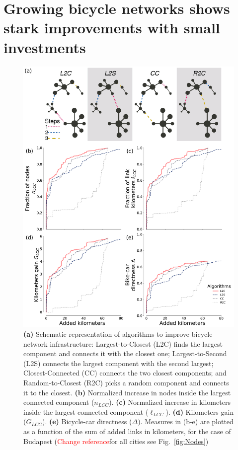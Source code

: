 \section{Growing bicycle networks shows stark improvements with small investments}

\begin{figure}[htbp]
  \centering
  \includegraphics[width=\textwidth]{images/datadriven/Fig03.pdf}
  \caption[Algorithms improvement]{\textbf{(a)} Schematic representation of algorithms to improve bicycle network infrastructure: Largest-to-Closest (L2C) finds the largest component and connects it with the closest one; Largest-to-Second (L2S) connects the largest component with the second largest; Closest-Connected (CC) connects the two closest components; and Random-to-Closest (R2C) picks a random component and connects it to the closest. \textbf{(b)} Normalized increase in nodes inside the largest connected component ($n_{LCC}$). \textbf{(c)} Normalized increase in kilometers inside the largest connected component ($\ell_{LCC}$). \textbf{(d)} Kilometers gain ($G_{LCC}$). \textbf{(e)} Bicycle-car directness ($\Delta$). Measures in (b-e) are plotted as a function of the sum of added links in kilometers, for the case of Budapest (\textcolor{red}{Change reference}for all cities see Fig.~\ref{fig:Nodes})}
  \label{fig:Algorithms}
\end{figure}

